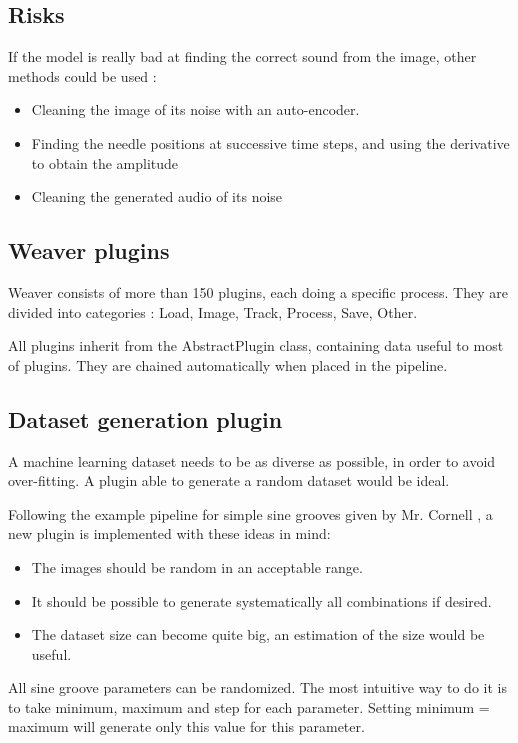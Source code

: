 \documentclass[12pt, twoside]{article}
\begin{document}
\subsection{Risks}
If the model is really bad at finding the correct sound from the image, other methods could be used :
\begin{itemize}
\item Cleaning the image of its noise with an auto-encoder.
\item Finding the needle positions at successive time steps, and using the derivative to obtain the amplitude
\item Cleaning the generated audio of its noise
\end{itemize}

\subsection{Weaver plugins}
Weaver consists of more than 150 plugins, each doing a specific process. They are divided into categories : Load, Image, Track, Process, Save, Other.

All plugins inherit from the AbstractPlugin class, containing data useful to most of plugins. They are chained automatically when placed in the pipeline. 
\subsection{Dataset generation plugin}
A machine learning dataset needs to be as diverse as possible, in order to avoid over-fitting. A plugin able to generate a random dataset would be ideal.

Following the example pipeline for simple sine grooves given by Mr. Cornell %
, a new plugin is implemented with these ideas in mind:
\begin{itemize}
	\item The images should be random in an acceptable range.
	\item It should be possible to generate systematically all combinations if desired.
	\item The dataset size can become quite big, an estimation of the size would be useful.
\end{itemize}

All sine groove parameters can be randomized. The most intuitive way to do it is to take minimum, maximum and step for each parameter. Setting minimum = maximum will generate only this value for this parameter.
\end{document}
